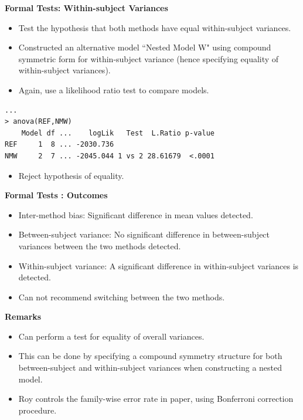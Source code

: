 \documentclass[compress]{beamer}        %
\makeatletter
\newcommand{\tcb}{\textcolor{beamer@blendedblue}}
\makeatother
\begin{document}
\begin{frame}[fragile]{\bf \tcb{Formal Tests: Within-subject Variances}}
\begin{itemize}
\item Test the hypothesis that both methods have equal within-subject variances.
\item Constructed an alternative model ``Nested Model W" using compound symmetric form for within-subject variance (hence specifying equality of within-subject variances).
\item Again, use a likelihood ratio test to compare models.
\end{itemize}
\begin{verbatim}
...
> anova(REF,NMW)
    Model df ...    logLik   Test  L.Ratio p-value
REF     1  8 ... -2030.736
NMW     2  7 ... -2045.044 1 vs 2 28.61679  <.0001
\end{verbatim}
\begin{itemize}
\item Reject hypothesis of equality.
\end{itemize}
\end{frame}
\begin{frame}[fragile]{\bf \tcb{Formal Tests : Outcomes}}
\begin{itemize}
\item Inter-method bias: Significant difference in mean values detected.\\
\vspace{0.25cm}\item Between-subject variance: No significant difference in between-subject variances between the two methods detected.\\
\vspace{0.25cm}\item Within-subject variance: A significant difference in within-subject variances is detected.\\
\vspace{0.25cm}\item Can not recommend switching between the two methods.
\end{itemize}
\end{frame}
\begin{frame}[fragile]{\bf \tcb{Remarks}}
\begin{itemize}
\item Can perform a test for equality of overall variances.\\
\vspace{0.25cm}\item This can be done by specifying a compound symmetry structure for both between-subject and within-subject variances when constructing a nested model.\\
\vspace{0.25cm}\item Roy controls the family-wise error rate in paper, using Bonferroni correction procedure.
\end{itemize}
\end{frame}
\end{document}
